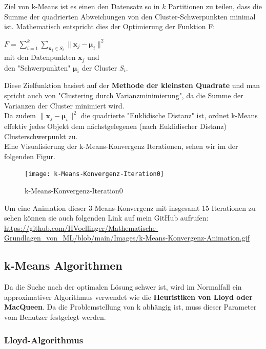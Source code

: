 \documentclass[12pt]{article}
\begin{document}
Ziel von k-Means ist es einen den Datensatz so in $k$ Partitionen zu teilen, dass die Summe der quadrierten Abweichungen von den Cluster-Schwerpunkten minimal ist. Mathematisch entspricht dies der Optimierung der Funktion F:\\
\begin{center}
$ F = \sum_{i=1}^{k}  \sum_{\mathbf x_j \in S_{i}} {\| \mathbf x_j - \boldsymbol \mu_i \|^2}$ \\[0.2cm]
mit den Datenpunkten $ \mathbf x_j $ und \\
den "Schwerpunkten" $ \boldsymbol \mu_i $ der Cluster $ S_i $.\\[0.2cm]
\end{center}
%
Diese Zielfunktion basiert auf der \textbf{Methode der kleinsten Quadrate} und man spricht auch von "Clustering durch Varianzminimierung", da die Summe der Varianzen der Cluster minimiert wird.\\[0.2cm]
Da zudem $ \| \mathbf x_j - \boldsymbol \mu_i \|^2 $ die quadrierte "Euklidische Distanz" ist, ordnet k-Means effektiv jedes Objekt dem nächstgelegenen (nach Euklidischer Distanz) Clusterschwerpunkt zu.\\ 
Eine Visualisierung der k-Means-Konvergenz Iterationen, sehen wir im der folgenden Figur.
\newpage
%
\begin{figure}[htp]
  \centering
  \hspace*{-0.1cm} 
  \texttt{[image: k-Means-Konvergenz-Iteration0]}
  \caption{k-Means-Konvergenz-Iteration0}
  \label{fig:k-Means-Iteration0}
\end{figure}
%
Um eine Animation dieser 3-Means-Konvergenz mit insgesamt 15 Iterationen zu sehen können sie auch folgenden Link auf mein GitHub aufrufen:\\
\url{https://github.com/HVoellinger/Mathematische-Grundlagen_von_ML/blob/main/Images/k-Means-Konvergenz-Animation.gif}\\

\subsection{k-Means Algorithmen}

Da die Suche nach der optimalen Lösung schwer ist, wird im Normalfall ein approximativer Algorithmus verwendet wie die \textbf{ Heuristiken von Lloyd oder MacQueen}. Da die Problemstellung von k abhängig ist, muss dieser Parameter vom Benutzer festgelegt werden.\\

\subsubsection{Lloyd-Algorithmus}
\end{document}
